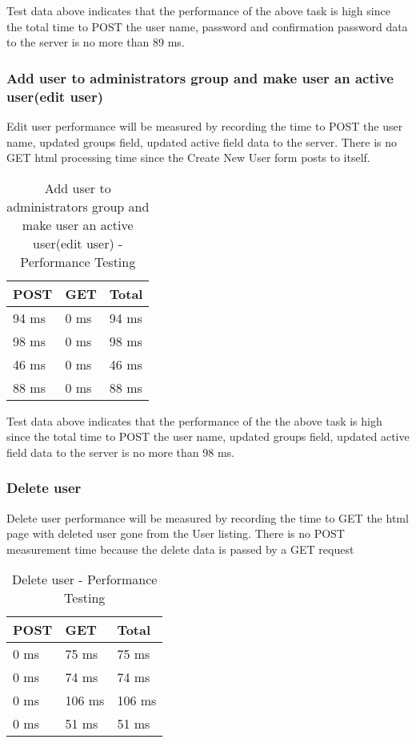 \documentclass[12pt]{article}
\begin{document}
Test data above indicates that the performance of the above task is high since the total time to POST the user name, password and confirmation password data to the server is no more than 89 ms.

\subsubsection{Add user to administrators group and make user an active user(edit user)}
Edit user performance will be measured by recording the time to POST the user name, updated groups field, updated active field data to the server. There is no GET html processing time since the Create New User form posts to itself.

\begin{table}[H]
\centering
\caption{Add user to administrators group and make user an active user(edit user) - Performance Testing}
\begin{tabular}{|l|l|l|}
\hline
POST  & GET  & Total \\ \hline
94 ms & 0 ms & 94 ms \\ \hline
98 ms & 0 ms & 98 ms \\ \hline
46 ms & 0 ms & 46 ms \\ \hline
88 ms & 0 ms & 88 ms \\ \hline
\end{tabular}
\end{table}

Test data above indicates that the performance of the the above task is high since the total time to POST the user name, updated groups field, updated active field data to the server is no more than 98 ms.

\subsubsection{Delete user}
Delete user performance will be measured by recording the time to GET the html page with deleted user gone from the User listing. There is no POST measurement time because the delete data is passed by a GET request

\begin{table}[H]
\centering
\caption{Delete user - Performance Testing}
\begin{tabular}{|l|l|l|}
\hline
POST & GET    & Total  \\ \hline
0 ms & 75 ms  & 75 ms  \\ \hline
0 ms & 74 ms  & 74 ms  \\ \hline
0 ms & 106 ms & 106 ms \\ \hline
0 ms & 51 ms  & 51 ms  \\ \hline
\end{tabular}
\end{table}
\end{document}
